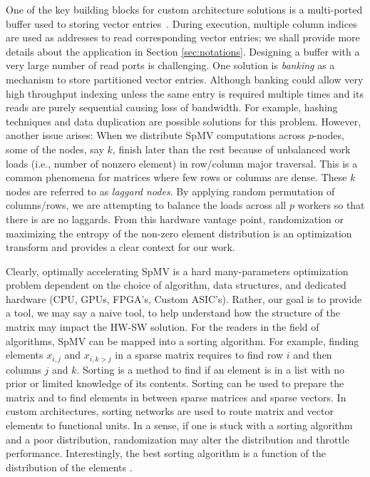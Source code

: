 \documentclass[manuscript,screen]{acmart}
\begin{document}
One of the key building blocks for custom architecture solutions is a
multi-ported buffer used to storing vector
entries~\cite{fowers2014high}.  During execution, multiple column
indices are used as addresses to read corresponding vector entries; we
shall provide more details about the application in Section
\ref{sec:notations}.  Designing a buffer with a very large number of
read ports is challenging.  One solution is {\em banking} as a
mechanism to store partitioned vector entries.  Although banking could
allow very high throughput indexing unless the same entry is required
multiple times and its reads are purely sequential causing loss of
bandwidth.  For example, hashing techniques and data duplication are
possible solutions for this problem. However, another issue arises:
When we distribute SpMV computations across $p$-nodes, some of the
nodes, say $k$, finish later than the rest because of unbalanced work
loads (i.e., number of nonzero element) in row/column major
traversal. This is a common phenomena for matrices where few rows or
columns are dense. These $k$ nodes are referred to as {\em laggard
  nodes}.  By applying random permutation of columns/rows, we are
attempting to balance the loads across all $p$ workers so that there
is are no laggards. From this hardware vantage point, randomization or
maximizing the entropy of the non-zero element distribution is an
optimization transform and provides a clear context for our work.

Clearly, optimally accelerating SpMV is a hard many-parameters
optimization problem dependent on the choice of algorithm, data
structures, and dedicated hardware (CPU, GPUs, FPGA's, Custom ASIC's).
Rather, our goal is to provide a tool, we may say a naive tool, to
help understand how the structure of the matrix may impact the HW-SW
solution.  For the readers in the field of algorithms, SpMV can be
mapped into a sorting algorithm. For example, finding elements
$x_{i,j}$ and $x_{i,k>j}$ in a sparse matrix requires to find row $i$
and then columns $j$ and $k$.  Sorting is a method to find if an
element is in a list with no prior or limited knowledge of its
contents.  Sorting can be used to prepare the matrix and to find
elements in between sparse matrices and sparse vectors. In custom
architectures, sorting networks are used to route matrix and vector
elements to functional units. In a sense, if one is stuck with a
sorting algorithm and a poor distribution, randomization may alter the
distribution and throttle performance. Interestingly, the best sorting
algorithm is a function of the distribution of the elements
\cite{LiGP2004,HuangGl2009}.
\end{document}
